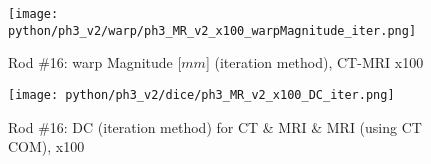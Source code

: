 \begin{figure}[!htb]
    \centering
    \texttt{[image: python/ph3\_v2/warp/ph3\_MR\_v2\_x100\_warpMagnitude\_iter.png]}
    \caption{Rod \#16: warp Magnitude [$mm$] (iteration method), CT-MRI x100}
    \label{fig:ph3_warpMagnitude_x100}
\end{figure}

\begin{figure}[!htb]
     \centering
     \texttt{[image: python/ph3\_v2/dice/ph3\_MR\_v2\_x100\_DC\_iter.png]}
     \caption{Rod \#16: DC (iteration method) for CT \& MRI \& MRI (using CT COM), x100}
     \label{fig:ph3_DC_x100}
\end{figure}


\cleardoublepage
